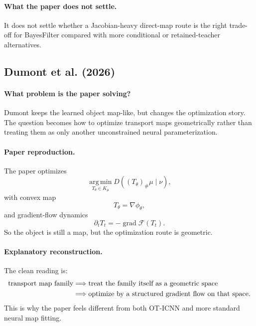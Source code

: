 \documentclass[11pt]{report}
\newcommand{\argmin}{\operatorname*{arg\,min}}
\newcommand{\pushf}[2]{\left(#1\right)_{\#} #2}
\begin{document}
\paragraph{What the paper does not settle.}
It does not settle whether a Jacobian-heavy direct-map route is the right trade-off
for BayesFilter compared with more conditional or retained-teacher alternatives.

\subsection*{Dumont et al. (2026)}

\paragraph{What problem is the paper solving?}
Dumont keeps the learned object map-like, but changes the optimization story.  The
question becomes how to optimize transport maps geometrically rather than treating
them as only another unconstrained neural parameterization.

\paragraph{Paper reproduction.}
The paper optimizes
\begin{equation}
\argmin_{T_\theta\in K_{\mu}} D(\pushf{T_\theta}{\mu}\mid \nu),
\label{eq:dumont-divergence}
\end{equation}
with convex map
\begin{equation}
T_\theta = \nabla \phi_\theta,
\label{eq:dumont-convex-map}
\end{equation}
and gradient-flow dynamics
\begin{equation}
\partial_t T_t = -\operatorname{grad}\mathcal F(T_t).
\label{eq:dumont-gradient-flow}
\end{equation}
So the object is still a map, but the optimization route is geometric.

\paragraph{Explanatory reconstruction.}
The clean reading is:
\begin{align}
\text{transport map family}
&\Longrightarrow
\text{treat the family itself as a geometric space}
\notag\\
&\Longrightarrow
\text{optimize by a structured gradient flow on that space}.
\label{eq:dumont-logic}
\end{align}
This is why the paper feels different from both OT-ICNN and more standard neural map
fitting.
\end{document}
